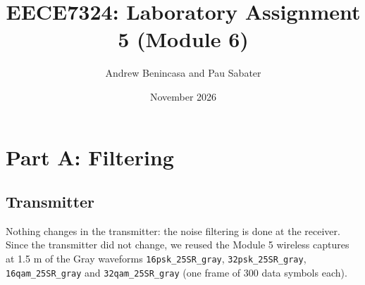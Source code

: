 \documentclass[11pt]{article}
\title{EECE7324: Laboratory Assignment 5 (Module 6)}
\author{Andrew Benincasa and Pau Sabater}
\date{November 2026}
\begin{document}
\maketitle

\section*{Part A: Filtering}
\subsection*{Transmitter}
Nothing changes in the transmitter: the noise filtering is done at the receiver. Since the transmitter did not change, we reused the Module 5 wireless captures at 1.5 m of the Gray waveforms \texttt{16psk\_25SR\_gray}, \texttt{32psk\_25SR\_gray}, \texttt{16qam\_25SR\_gray} and \texttt{32qam\_25SR\_gray} (one frame of 300 data symbols each).
\end{document}

